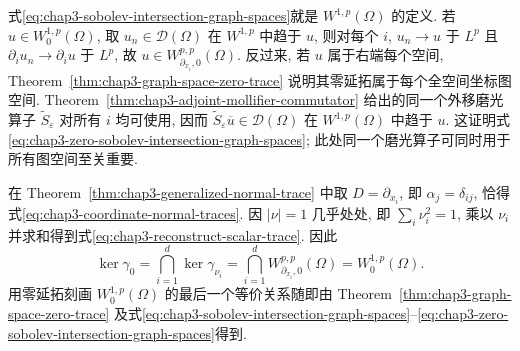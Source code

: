 \begin{Proof}
式\eqref{eq:chap3-sobolev-intersection-graph-spaces}就是 $W^{1,p}(\Omega)$ 的定义. 若 $u\in W_0^{1,p}(\Omega)$, 取 $u_n\in\mathcal D(\Omega)$ 在 $W^{1,p}$ 中趋于 $u$, 则对每个 $i$, $u_n\to u$ 于 $L^p$ 且 $\partial_iu_n\to\partial_iu$ 于 $L^p$, 故 $u\in W_{\partial_{x_i},0}^{p,p}(\Omega)$. 反过来, 若 $u$ 属于右端每个空间, Theorem~\ref{thm:chap3-graph-space-zero-trace} 说明其零延拓属于每个全空间坐标图空间. Theorem~\ref{thm:chap3-adjoint-mollifier-commutator} 给出的同一个外移磨光算子 $\widetilde S_\varepsilon$ 对所有 $i$ 均可使用, 因而 $\widetilde S_\varepsilon\overline u\in\mathcal D(\Omega)$ 在 $W^{1,p}(\Omega)$ 中趋于 $u$. 这证明式\eqref{eq:chap3-zero-sobolev-intersection-graph-spaces}; 此处同一个磨光算子可同时用于所有图空间至关重要.

在 Theorem~\ref{thm:chap3-generalized-normal-trace} 中取 $D=\partial_{x_i}$, 即 $\alpha_j=\delta_{ij}$, 恰得式\eqref{eq:chap3-coordinate-normal-traces}. 因 $|\nu|=1$ 几乎处处, 即 $\sum_i\nu_i^2=1$, 乘以 $\nu_i$ 并求和得到式\eqref{eq:chap3-reconstruct-scalar-trace}. 因此
\[
 \ker\gamma_0=\bigcap_{i=1}^d\ker\gamma_{\nu_i}
 =\bigcap_{i=1}^dW_{\partial_{x_i},0}^{p,p}(\Omega)
 =W_0^{1,p}(\Omega).
\]
用零延拓刻画 $W_0^{1,p}(\Omega)$ 的最后一个等价关系随即由 Theorem~\ref{thm:chap3-graph-space-zero-trace} 及式\eqref{eq:chap3-sobolev-intersection-graph-spaces}--\eqref{eq:chap3-zero-sobolev-intersection-graph-spaces}得到.
\end{Proof}
